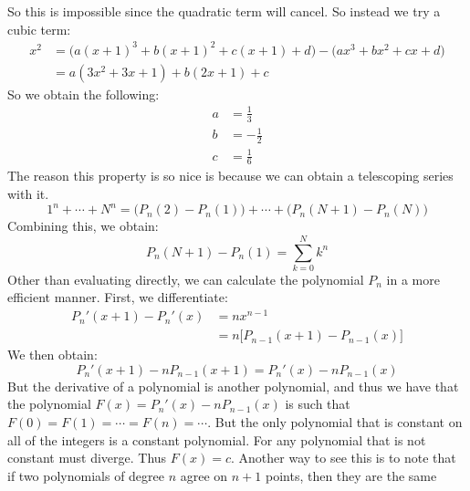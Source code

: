             So this is impossible since the quadratic term will
            cancel. So instead we try a cubic term:
            \begin{align}
                x^{2}&=
                \big(a(x+1)^{3}+b(x+1)^{2}+c(x+1)+d)-
                \big(ax^{3}+bx^{2}+cx+d)\\
                &=a(3x^{2}+3x+1)+b(2x+1)+c
            \end{align}
            So we obtain the following:
            \begin{align}
                a&=\frac{1}{3}\\
                b&=-\frac{1}{2}\\
                c&=\frac{1}{6}
            \end{align}
            The reason this property is so nice is because we can
            obtain a telescoping series with it.
            \begin{equation}
                1^{n}+\cdots+N^{n}
                =\big(P_{n}(2)-P_{n}(1)\big)+\cdots+
                \big(P_{n}(N+1)-P_{n}(N)\big)
            \end{equation}
            Combining this, we obtain:
            \begin{equation}
                P_{n}(N+1)-P_{n}(1)=\sum_{k=0}^{N}k^{n}
            \end{equation}
            Other than evaluating directly, we can calculate the
            polynomial $P_{n}$ in a more efficient manner. First,
            we differentiate:
            \begin{align}
                P_{n}'(x+1)-P_{n}'(x)&=nx^{n-1}\\
                &=n\big[P_{n-1}(x+1)-P_{n-1}(x)\big]
            \end{align}
            We then obtain:
            \begin{equation}
                P_{n}'(x+1)-nP_{n-1}(x+1)=P_{n}'(x)-nP_{n-1}(x)
            \end{equation}
            But the derivative of a polynomial is another
            polynomial, and thus we have that the polynomial
            $F(x)=P_{n}'(x)-nP_{n-1}(x)$ is such that
            $F(0)=F(1)=\cdots=F(n)=\cdots$. But the only polynomial
            that is constant on all of the integers is a constant
            polynomial. For any polynomial that is not constant
            must diverge. Thus $F(x)=c$. Another way to see this
            is to note that if two polynomials of degree $n$
            agree on $n+1$ points, then they are the same
